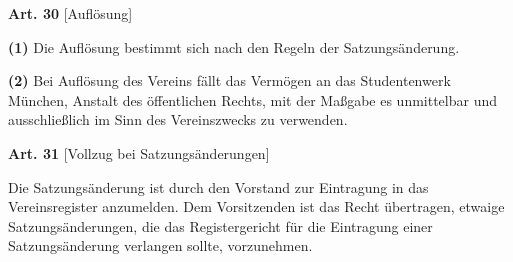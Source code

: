 \documentclass[12pt]{article}
\newcommand{\Satz}[2]{

\begin{samepage}
{\bf (#1)} #2
\end{samepage}
}
\newenvironment{Artikel}[2]{
\bigskip \centerline{{\bf Art. #1} [#2]}
\nopagebreak
}{
}
\begin{document}
\begin{Artikel}{30}{Auflösung}

\Satz{1}{Die Auflösung bestimmt sich nach den Regeln der Satzungsänderung.}

\Satz{2}{Bei Auflösung des Vereins fällt das Vermögen an das Studentenwerk
München, Anstalt des öffentlichen Rechts, mit der Maßgabe es unmittelbar und
ausschließlich im Sinn des Vereinszwecks zu verwenden.}

\end{Artikel}

\begin{Artikel}{31}{Vollzug bei Satzungsänderungen}

Die Satzungsänderung ist durch den Vorstand zur Eintragung in das
Vereinsregister anzumelden. Dem Vorsitzenden ist das Recht übertragen, etwaige
Satzungsänderungen, die das Registergericht für die Eintragung einer
Satzungsänderung verlangen sollte, vorzunehmen.

\end{Artikel}
\end{document}
